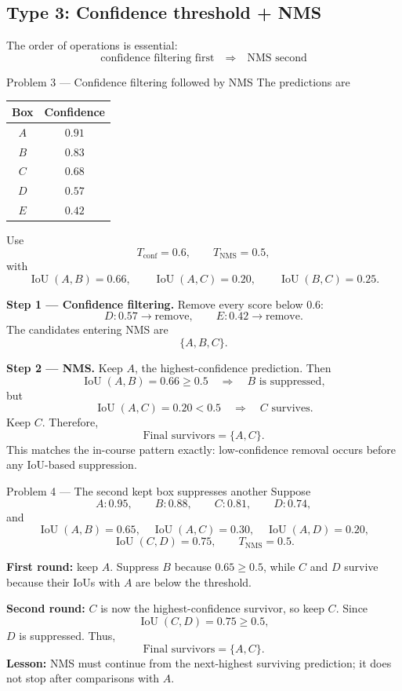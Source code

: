 \documentclass[11pt]{article}
\begin{document}
\subsection{Type 3: Confidence threshold + NMS}

The order of operations is essential:
\[
\boxed{
\text{confidence filtering first}
\quad\Longrightarrow\quad
\text{NMS second}
}
\]

\begin{practicebox}{Problem 3 --- Confidence filtering followed by NMS}
The predictions are

\begin{center}
\begin{tabular}{cc}
\toprule
\textbf{Box} & \textbf{Confidence} \\
\midrule
\(A\) & \(0.91\) \\
\(B\) & \(0.83\) \\
\(C\) & \(0.68\) \\
\(D\) & \(0.57\) \\
\(E\) & \(0.42\) \\
\bottomrule
\end{tabular}
\end{center}

Use
\[
T_{\mathrm{conf}}=0.6,
\qquad
T_{\mathrm{NMS}}=0.5,
\]
with
\[
\operatorname{IoU}(A,B)=0.66,
\qquad
\operatorname{IoU}(A,C)=0.20,
\qquad
\operatorname{IoU}(B,C)=0.25.
\]

\textbf{Step 1 --- Confidence filtering.} Remove every score below \(0.6\):
\[
D:0.57\to\text{remove},
\qquad
E:0.42\to\text{remove}.
\]
The candidates entering NMS are
\[
\boxed{\{A,B,C\}}.
\]

\textbf{Step 2 --- NMS.} Keep \(A\), the highest-confidence prediction. Then
\[
\operatorname{IoU}(A,B)=0.66\geq0.5
\quad\Rightarrow\quad B\text{ is suppressed},
\]
but
\[
\operatorname{IoU}(A,C)=0.20<0.5
\quad\Rightarrow\quad C\text{ survives}.
\]
Keep \(C\). Therefore,
\[
\boxed{\text{Final survivors}=\{A,C\}}.
\]
This matches the in-course pattern exactly: low-confidence removal occurs before any IoU-based suppression.
\end{practicebox}

\begin{practicebox}{Problem 4 --- The second kept box suppresses another}
Suppose
\[
A:0.95,\qquad B:0.88,\qquad C:0.81,\qquad D:0.74,
\]
and
\[
\operatorname{IoU}(A,B)=0.65,\quad
\operatorname{IoU}(A,C)=0.30,\quad
\operatorname{IoU}(A,D)=0.20,
\]
\[
\operatorname{IoU}(C,D)=0.75,
\qquad
T_{\mathrm{NMS}}=0.5.
\]

\textbf{First round:} keep \(A\). Suppress \(B\) because \(0.65\geq0.5\), while \(C\) and \(D\) survive because their IoUs with \(A\) are below the threshold.

\textbf{Second round:} \(C\) is now the highest-confidence survivor, so keep \(C\). Since
\[
\operatorname{IoU}(C,D)=0.75\geq0.5,
\]
\(D\) is suppressed. Thus,
\[
\boxed{\text{Final survivors}=\{A,C\}}.
\]
\textbf{Lesson:} NMS must continue from the next-highest surviving prediction; it does not stop after comparisons with \(A\).
\end{practicebox}
\end{document}

